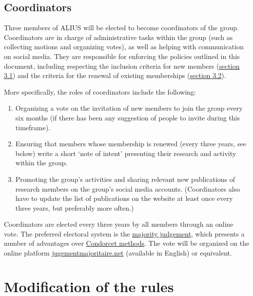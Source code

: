 \documentclass[a4paper, 11pt]{scrartcl}
\begin{document}
\subsection{Coordinators}
\label{coordinators}

Three members of ALIUS will be elected to become coordinators of the group. Coordinators are in charge of administrative tasks within the group (such as collecting motions and organizing votes), as well as helping with communication on social media. They are responsible for enforcing the policies outlined in this document, including respecting the inclusion criteria for new members (\hyperref[new_memberships]{section 3.1}) and the criteria for the renewal of existing memberships (\hyperref[membership_renewal]{section 3.2}).

More specifically, the roles of coordinators include the following:

\begin{enumerate}

\item Organizing a vote on the invitation of new members to join the group every six months (if there has been any suggestion of people to invite during this timeframe).
\item Ensuring that members whose membership is renewed (every three years, see below) write a short `note of intent' presenting their research and activity within the group.
\item Promoting the group's activities and sharing relevant new publications of research members on the group's social media accounts. (Coordinators also have to update the list of publications on the website at least once every three years, but preferably more often.)

\end{enumerate}

\noindent Coordinators are elected every three years by all members through an online vote. The preferred electoral system is the \href{https://en.wikipedia.org/wiki/Majority_judgment}{majority judgement}, which presents a number of advantages over \href{https://en.wikipedia.org/wiki/Condorcet_method}{Condorcet methods}. The vote will be organized on the online platform \href{https://jugementmajoritaire.net/}{jugementmajoritaire.net} (available in English) or equivalent.

\section{Modification of the rules}
\label{modif}
\end{document}
